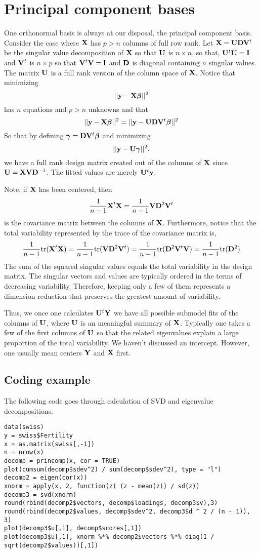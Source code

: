\section{Principal component bases}

One orthonormal basis is always at our disposal, the principal component basis. 
Consider the case where $\mathbf{X}$ has $p > n$ columns of full row rank.
Let $\mathbf{X} = \mathbf{U} \mathbf{D} \mathbf{V}^t$ be the singular value decomposition of $\mathbf{X}$ so
that $\mathbf{U}$ is $n \times n$, so that, $\mathbf{U}^t \mathbf{U} = \mathbf{I}$ and $\mathbf{V}^t$
is $n\times p$ so that $\mathbf{V}^t \mathbf{V} = \mathbf{I}$ and $\mathbf{D}$ is diagonal containing
$n$ singular values. The matrix $\mathbf{U}$ is a full rank version of the
column space of $\mathbf{X}$. Notice that minimizing
$$
||\mathbf{y} - \mathbf{X} \boldsymbol{\beta}||^2
$$
has $n$ equations and $p>n$ unknowns and that
$$
||\mathbf{y} - \mathbf{X} \boldsymbol{\beta}||^2
= 
||\mathbf{y} -  \mathbf{U} \mathbf{D} \mathbf{V}^t \boldsymbol{\beta}||^2
$$
So that by defining $\boldsymbol{\gamma} = \mathbf{D} \mathbf{V}^t \boldsymbol{\beta}$ and minimizing 
$$
||\mathbf{y} -  \mathbf{U} \boldsymbol{\gamma}||^2.
$$
we have a full rank design matrix created out of the columns of $\mathbf{X}$ since
$\mathbf{U} = \mathbf{X} \mathbf{V} \mathbf{D}^{-1}$. 
The fitted values are merely $\mathbf{U}^t \mathbf{y}$.

Note, if $\mathbf{X}$ has been centered, then 
$$
\frac{1}{n-1} \mathbf{X}^t \mathbf{X} = \frac{1}{n-1} \mathbf{V} \mathbf{D}^2 \mathbf{V}^t
$$
is the covariance matrix between the columns of $\mathbf{X}$. Furthermore,
notice that the total variability represented by the trace of the covariance
matrix is, 
$$\frac{1}{n-1} \mbox{tr}(\mathbf{X}^t \mathbf{X})
= \frac{1}{n-1} \mbox{tr}(\mathbf{V} \mathbf{D}^2 \mathbf{V}^t)
=\frac{1}{n-1} \mbox{tr}(\mathbf{D}^2 \mathbf{V}^t \mathbf{V})
= \frac{1}{n-1} \mbox{tr}(\mathbf{D}^2)
$$
The sum of the squared singular values equals the total variability in the
design matrix. 
The singular
vectors and values are typically ordered in the terms of decreasing
variability. Therefore, keeping only a few of them represents a dimension
reduction that preserves the greatest amount of variability.

Thus, we once one calculates $\mathbf{U}^t \mathbf{Y}$ we have all possible submodel
fits of the columns of $\mathbf{U}$, where $\mathbf{U}$ is an meaningful summary
of $\mathbf{X}$. Typically one takes a few of the first columns of $\mathbf{U}$
so that the related eigenvalues explain a large proportion of the
total variability. We haven't discussed an intercept. However, 
one usually mean centers $\mathbf{Y}$ and $\mathbf{X}$ first.


\subsection{Coding example}

The following code goes through calculation of SVD and eigenvalue 
decompositions.

\begin{verbatim}
data(swiss)
y = swiss$Fertility
x = as.matrix(swiss[,-1])
n = nrow(x)
decomp = princomp(x, cor = TRUE)
plot(cumsum(decomp$sdev^2) / sum(decomp$sdev^2), type = "l")
decomp2 = eigen(cor(x))
xnorm = apply(x, 2, function(z) (z - mean(z)) / sd(z))
decomp3 = svd(xnorm)
round(rbind(decomp2$vectors, decomp$loadings, decomp3$v),3)
round(rbind(decomp2$values, decomp$sdev^2, decomp3$d ^ 2 / (n - 1)), 3)
plot(decomp3$u[,1], decomp$scores[,1])
plot(decomp3$u[,1], xnorm %*% decomp2$vectors %*% diag(1 / sqrt(decomp2$values))[,1])
\end{verbatim}

